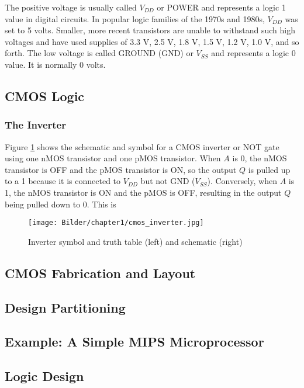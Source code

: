 The positive voltage is usually called $V_{DD}$ or POWER and represents a logic 1 value in digital circuits. In popular logic families of the 1970s and 1980s, $V_{DD}$
was set to 5 volts. Smaller, more recent transistors are unable to withstand such high voltages and have used supplies of 3.3 V, 2.5 V, 1.8 V, 1.5 V, 1.2 V, 1.0 V, and so forth.
The low voltage is called GROUND (GND) or $V_{SS}$ and represents a logic 0 value. It is normally 0 volts.

\subsection{CMOS Logic}

\subsubsection{The Inverter}

Figure \ref{fig:cmos_inverter} shows the schematic and symbol for a CMOS inverter or NOT gate using one nMOS transistor and one pMOS transistor. When 
$A$ is 0, the nMOS transistor is OFF and the pMOS transistor is ON, so the output $Q$ is pulled up to a 1 because it is connected to $V_{DD}$ but not GND ($V_{SS}$).
Conversely, when $A$ is 1, the nMOS transistor is ON and the pMOS is OFF, resulting in the output $Q$ being pulled down to 0. This is 

\begin{figure}[H]
    \centering
    \texttt{[image: Bilder/chapter1/cmos\_inverter.jpg]}
    \caption{Inverter symbol and truth table (left) and schematic (right)}
    \label{fig:cmos_inverter}
\end{figure}

\subsection{CMOS Fabrication and Layout}

\subsection{Design Partitioning}

\subsection{Example: A Simple MIPS Microprocessor}

\subsection{Logic Design}

